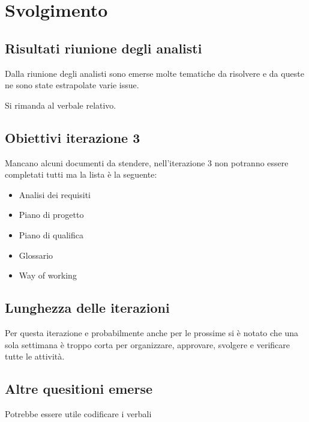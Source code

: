 \section{Svolgimento}

\subsection{Risultati riunione degli analisti}

Dalla riunione degli analisti sono emerse molte tematiche da risolvere e da queste ne sono state estrapolate varie issue.

Si rimanda al verbale relativo.

\subsection{Obiettivi iterazione 3}

Mancano alcuni documenti da stendere, nell'iterazione 3 non potranno essere completati tutti ma la lista è la seguente:

\begin{itemize}
    \item Analisi dei requisiti
    \item Piano di progetto
    \item Piano di qualifica
    \item Glossario
    \item Way of working
\end{itemize}

\subsection{Lunghezza delle iterazioni}

Per questa iterazione e probabilmente anche per le prossime si è notato che una sola settimana è troppo corta per organizzare, approvare, svolgere e verificare tutte le attività.

\subsection{Altre quesitioni emerse}

Potrebbe essere utile codificare i verbali